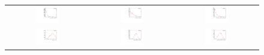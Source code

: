 \begin{figure}
\centering
\begin{tabular}{ccc}
\includegraphics[width=0.3\textwidth]{ANA_resources/Plots/Monte_carlo/data_vs_MC/weight/Kpipipi/acos(Bd_DIRA_OWNPV)_2012.pdf} & \includegraphics[width=0.3\textwidth]{ANA_resources/Plots/Monte_carlo/data_vs_MC/weight/Kpipipi/Bd_IPCHI2_OWNPV_2012.pdf} & \includegraphics[width=0.3\textwidth]{ANA_resources/Plots/Monte_carlo/data_vs_MC/weight/Kpipipi/Bd_LOKI_VFASPF_VCHI2VDOF_2012.pdf} \\
\includegraphics[width=0.3\textwidth]{ANA_resources/Plots/Monte_carlo/data_vs_MC/weight/Kpipipi/Bd_ptasy_1_50_2012.pdf} & \includegraphics[width=0.3\textwidth]{ANA_resources/Plots/Monte_carlo/data_vs_MC/weight/Kpipipi/log10(D0_IPCHI2_OWNPV)_2012.pdf} & \includegraphics[width=0.3\textwidth]{ANA_resources/Plots/Monte_carlo/data_vs_MC/weight/Kpipipi/log10(KstarK_IPCHI2_OWNPV)_2012.pdf} \\

\end{tabular}
\end{figure}
